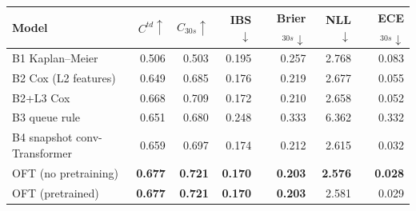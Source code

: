 \begin{tabular}{lrrrrrr}
\toprule
Model & $C^{td}\uparrow$ & $C_{30s}\uparrow$ & IBS$\downarrow$ & Brier$_{30s}\downarrow$ & NLL$\downarrow$ & ECE$_{30s}\downarrow$ \\
\midrule
B1 Kaplan--Meier & 0.506 & 0.503 & 0.195 & 0.257 & 2.768 & 0.083 \\
B2 Cox (L2 features) & 0.649 & 0.685 & 0.176 & 0.219 & 2.677 & 0.055 \\
B2+L3 Cox & 0.668 & 0.709 & 0.172 & 0.210 & 2.658 & 0.052 \\
B3 queue rule & 0.651 & 0.680 & 0.248 & 0.333 & 6.362 & 0.332 \\
\midrule
B4 snapshot conv-Transformer & 0.659 & 0.697 & 0.174 & 0.212 & 2.615 & 0.032 \\
OFT (no pretraining) & \textbf{0.677} & \textbf{0.721} & \textbf{0.170} & \textbf{0.203} & \textbf{2.576} & \textbf{0.028} \\
OFT (pretrained) & \textbf{0.677} & \textbf{0.721} & \textbf{0.170} & \textbf{0.203} & 2.581 & 0.029 \\
\bottomrule
\end{tabular}
